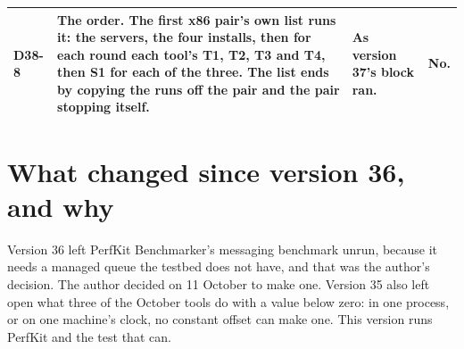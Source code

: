 \documentclass[11pt]{article}
\begin{document}
{\begin{longtable}{@{}p{1.1cm} >{\raggedright\arraybackslash}p{6.1cm} >{\raggedright\arraybackslash}p{6.0cm} >{\raggedright\arraybackslash}p{2.2cm}@{}}
D38-8 & The order. The first x86 pair's own list runs it: the servers, the four installs, then for each round each tool's T1, T2, T3 and T4, then S1 for each of the three. The list ends by copying the runs off the pair and the pair stopping itself. & As version 37's block ran. & \textbf{No.} \\
\bottomrule
\end{longtable}}

\section*{What changed since version 36, and why}
Version 36 left PerfKit Benchmarker's messaging benchmark unrun, because it needs a managed queue
the testbed does not have, and that was the author's decision. The author decided on 11 October to
make one. Version 35 also left open what three of the October tools do with a value below zero:
in one process, or on one machine's clock, no constant offset can make one. This version runs
PerfKit and the test that can.
\end{document}
